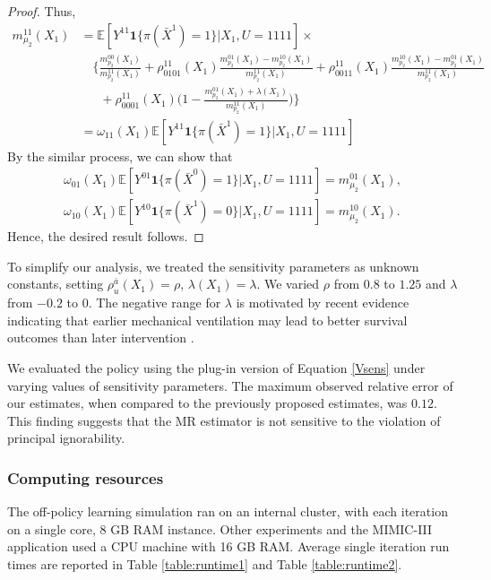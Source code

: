 \documentclass{article}
\newcommand{\E}{\mathbb{E}}
\begin{document}
\begin{proof}
Thus, 
\begin{align*}
m_{\mu_2}^{11}(X_1) &= \E[ Y^{11}\mathbf{1}\{\pi(\bar X^1)=1\}| X_1, U=1111] \times \\
&\quad \bigg\{ 
  \frac{m_{p_2}^{00}(X_1)}{m_{p_2}^{11}(X_1)} 
  + \rho_{0101}^{11}(X_1)\frac{m_{p_2}^{01}(X_1) - m_{p_2}^{10}(X_1)}{m_{p_2}^{11}(X_1)} 
  + \rho_{0011}^{11}(X_1) \frac{m_{p_2}^{10}(X_1) - m_{p_2}^{01}(X_1)}{m_{p_2}^{11}(X_1)} \\
 &\;\;\quad+ \rho_{0001}^{11}(X_1)\Big(1 - \frac{m_{p_2}^{01}(X_1) + \lambda(X_1)}{m_{p_2}^{11}(X_1)} \Big)
    \bigg\} \\
 &= \omega_{11}(X_1) \E[ Y^{11}\mathbf{1}\{\pi(\bar X^1)=1\}| X_1, U=1111]
\end{align*}
By the similar process, we can show that
\begin{align*}
	\omega_{01}(X_1) \E[ Y^{01}\mathbf{1}\{\pi(\bar X^0)=1\}| X_1, U=1111] = m_{\mu_2}^{01}(X_1), \\
	\omega_{10}(X_1) \E[ Y^{10}\mathbf{1}\{\pi(\bar X^1)=0\}| X_1, U=1111] = m_{\mu_2}^{10}(X_1).
\end{align*}
Hence, the desired result follows.
\end{proof}

To simplify our analysis, we treated the sensitivity parameters as unknown constants, setting $\rho_{u}^{\bar a}(X_1) = \rho$, $\lambda(X_1) = \lambda$. We varied $\rho$ from $0.8$ to $1.25$ and $\lambda$ from $-0.2$ to $0$. 
The negative range for $\lambda$ is motivated by recent evidence indicating that earlier mechanical ventilation may lead to better survival outcomes than later intervention \citep{kim2024impact}.

We evaluated the policy using the plug-in version of Equation \eqref{Vsens} under varying values of sensitivity parameters. The maximum observed relative error of our estimates, when compared to the previously proposed estimates, was $0.12$. This finding suggests that the MR estimator is not sensitive to the violation of principal ignorability.

\subsubsection{Computing resources}
\label{A:compres}

The off-policy learning simulation ran on an internal cluster, with each iteration on a single core, 8 GB RAM instance. 
Other experiments and the MIMIC-III application used a CPU machine with 16 GB RAM. 
Average single iteration run times are reported in Table \ref{table:runtime1} and Table \ref{table:runtime2}. 
\end{document}
